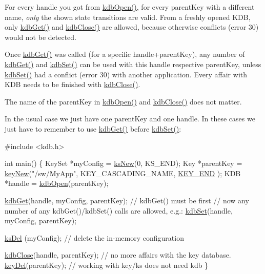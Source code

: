 For every handle you got from \hyperlink{group__kdb_ga6808defe5870f328dd17910aacbdc6ca}{kdb\-Open()}, for every parent\-Key with a different name, {\itshape only} the shown state transitions are valid. From a freshly opened K\-D\-B, only \hyperlink{group__kdb_ga28e385fd9cb7ccfe0b2f1ed2f62453a1}{kdb\-Get()} and \hyperlink{group__kdb_gadb54dc9fda17ee07deb9444df745c96f}{kdb\-Close()} are allowed, because otherwise conflicts (error 30) would not be detected.

Once \hyperlink{group__kdb_ga28e385fd9cb7ccfe0b2f1ed2f62453a1}{kdb\-Get()} was called (for a specific handle+parent\-Key), any number of \hyperlink{group__kdb_ga28e385fd9cb7ccfe0b2f1ed2f62453a1}{kdb\-Get()} and \hyperlink{group__kdb_ga11436b058408f83d303ca5e996832bcf}{kdb\-Set()} can be used with this handle respective parent\-Key, unless \hyperlink{group__kdb_ga11436b058408f83d303ca5e996832bcf}{kdb\-Set()} had a conflict (error 30) with another application. Every affair with K\-D\-B needs to be finished with \hyperlink{group__kdb_gadb54dc9fda17ee07deb9444df745c96f}{kdb\-Close()}.

The name of the parent\-Key in \hyperlink{group__kdb_ga6808defe5870f328dd17910aacbdc6ca}{kdb\-Open()} and \hyperlink{group__kdb_gadb54dc9fda17ee07deb9444df745c96f}{kdb\-Close()} does not matter.

In the usual case we just have one parent\-Key and one handle. In these cases we just have to remember to use \hyperlink{group__kdb_ga28e385fd9cb7ccfe0b2f1ed2f62453a1}{kdb\-Get()} before \hyperlink{group__kdb_ga11436b058408f83d303ca5e996832bcf}{kdb\-Set()}\-:


\begin{DoxyCodeInclude}
\textcolor{preprocessor}{#include <kdb.h>}

\textcolor{keywordtype}{int} main()
\{
        KeySet *myConfig = \hyperlink{group__keyset_ga671e1aaee3ae9dc13b4834a4ddbd2c3c}{ksNew}(0, KS\_END);
        Key *parentKey = \hyperlink{group__key_gad23c65b44bf48d773759e1f9a4d43b89}{keyNew}(\textcolor{stringliteral}{"/sw/MyApp"}, KEY\_CASCADING\_NAME, \hyperlink{group__key_gga91fb3178848bd682000958089abbaf40aa8adb6fcb92dec58fb19410eacfdd403}{KEY\_END}
      );
        KDB *handle = \hyperlink{group__kdb_ga6808defe5870f328dd17910aacbdc6ca}{kdbOpen}(parentKey);

        \hyperlink{group__kdb_ga28e385fd9cb7ccfe0b2f1ed2f62453a1}{kdbGet}(handle, myConfig, parentKey); \textcolor{comment}{// kdbGet() must be first}
        \textcolor{comment}{// now any number of any kdbGet()/kdbSet() calls are allowed, e.g.:}
        \hyperlink{group__kdb_ga11436b058408f83d303ca5e996832bcf}{kdbSet}(handle, myConfig, parentKey);

        \hyperlink{group__keyset_ga27e5c16473b02a422238c8d970db7ac8}{ksDel} (myConfig); \textcolor{comment}{// delete the in-memory configuration}

        \hyperlink{group__kdb_gadb54dc9fda17ee07deb9444df745c96f}{kdbClose}(handle, parentKey); \textcolor{comment}{// no more affairs with the key
       database.}
        \hyperlink{group__key_ga3df95bbc2494e3e6703ece5639be5bb1}{keyDel}(parentKey); \textcolor{comment}{// working with key/ks does not need kdb}
\}
\end{DoxyCodeInclude}


